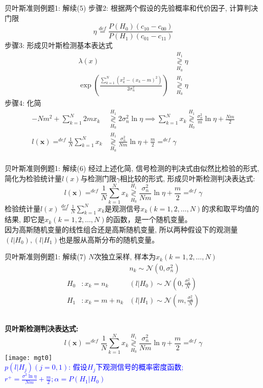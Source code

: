 \begin{frame}[shrink]{贝叶斯准则例题1: 解续(5)}
步骤2: 根据两个假设的先验概率和代价因子, 计算判决门限
\[\eta\mathop{=}\limits^{def}\frac{P(H_0)(c_{10}-c_{00})}{P(H_1)(c_{01}-c_{11})} \]
步骤3: 形成贝叶斯检测基本表达式
\begin{align*}
\lambda(x)&\mathop{\gtrless}\limits_{H_0}^{H_1}\eta\\
\exp\left(\frac{\sum\limits_{k=1}^{N}(x_k^2-(x_k-m)^2)}{2\sigma_n^2}\right)&\mathop{\gtrless}\limits_{H_0}^{H_1}\eta
\end{align*} 
步骤4: 化简
\begin{align*}
-Nm^2+\sum\limits_{k=1}^{N}2mx_k&\mathop{\gtrless}\limits_{H_0}^{H_1}2\sigma_n^2\ln\eta\implies \sum\limits_{k=1}^{N}x_k\mathop{\gtrless}\limits_{H_0}^{H_1}\frac{\sigma_n^2}{m}\ln\eta+\frac{Nm}{2}\\
l(\bm{x})\mathop{=}^{def}\frac{1}{N}\sum\limits_{k=1}^{N}x_k&\mathop{\gtrless}\limits_{H_0}^{H_1}\frac{\sigma_n^2}{Nm}\ln\eta+\frac{m}{2}\mathop{=}^{def}\gamma\\
\end{align*} 
\end{frame}

\begin{frame}[shrink]{贝叶斯准则例题1: 解续(6)}
经过上述化简, 信号检测的判决式由似然比检验的形式, 简化为检验统计量$l(x)$与检测门限$\gamma$相比较的形式, 形成贝叶斯检测判决表达式:
\[
l(\bm{x})\mathop{=}^{def}\frac{1}{N}\sum\limits_{k=1}^{N}x_k\mathop{\gtrless}\limits_{H_0}^{H_1}\frac{\sigma_n^2}{Nm}\ln\eta+\frac{m}{2}\mathop{=}^{def}\gamma
\]
检验统计量$l(x)\mathop{=}\limits^{def}\frac{1}{N}\sum\limits_{k=1}^Nx_k$是观测信号$x_k(k=1,2,\dots,N)$的求和取平均值的结果, 即它是$x_k(k=1,2,\dots,N)$的函数，是一个随机变量。\\
因为高斯随机变量的线性组合还是高斯随机变量,  所以两种假设下的观测量$(l|H_0),(l|H_1)$也是服从高斯分布的随机变量。
\end{frame}

\begin{frame}[shrink]{贝叶斯准则例题1: 解续(7)}
$N$次独立采样, 样本为$x_k(k=1,2,\dots,N)$
\begin{align*}
	&&n_k\sim\mathcal{N}(0,\sigma_n^2)\\ 
	H_0 &:x_k=n_k   &(l|H_0)\sim\mathcal{N}(0,\frac{\sigma_n^2}{N})\\
	H_1 &:x_k=m+n_k &(l|H_1)\sim\mathcal{N}(m,\frac{\sigma_n^2}{N})
\end{align*}
\begin{columns}
\textbf{贝叶斯检测判决表达式:}\\
\[
l(\bm{x})\mathop{=}^{def}\frac{1}{N}\sum\limits_{k=1}^{N}x_k\mathop{\gtrless}\limits_{H_0}^{H_1}\frac{\sigma_n^2}{Nm}\ln\eta+\frac{m}{2}\mathop{=}^{def}\gamma
\]
\texttt{[image: mgt0]}\\
\scriptsize
\textcolor{blue}{$p(l|H_j)(j=0,1)$: 假设$H_j$下观测信号的概率密度函数; $r^+=\frac{\sigma^2\ln\eta}{Nm}+\frac{m}{2}; \alpha=P(H_1|H_0)$}
\end{columns}
\end{frame}



